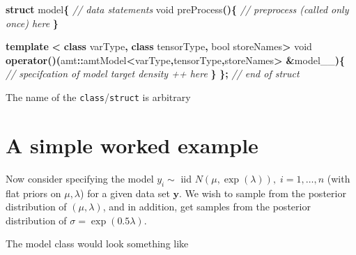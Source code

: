 \documentclass[
]{book}
\newenvironment{Shaded}{\begin{snugshade}}{\end{snugshade}}
\newcommand{\CommentTok}[1]{\textcolor[rgb]{0.56,0.35,0.01}{\textit{#1}}}
\newcommand{\DataTypeTok}[1]{\textcolor[rgb]{0.13,0.29,0.53}{#1}}
\newcommand{\KeywordTok}[1]{\textcolor[rgb]{0.13,0.29,0.53}{\textbf{#1}}}
\newcommand{\NormalTok}[1]{#1}
\newcommand{\OperatorTok}[1]{\textcolor[rgb]{0.81,0.36,0.00}{\textbf{#1}}}
\begin{document}
\begin{Shaded}
\begin{Highlighting}[]
\KeywordTok{struct}\NormalTok{ model}\OperatorTok{\{}
  \CommentTok{// data statements}
  \DataTypeTok{void}\NormalTok{ preProcess}\OperatorTok{()\{}
    \CommentTok{// preprocess (called only once) here}
  \OperatorTok{\}} 

  \KeywordTok{template} \OperatorTok{\textless{}} \KeywordTok{class}\NormalTok{ varType}\OperatorTok{,} \KeywordTok{class}\NormalTok{ tensorType}\OperatorTok{,} \DataTypeTok{bool}\NormalTok{ storeNames}\OperatorTok{\textgreater{}}
  \DataTypeTok{void} \KeywordTok{operator}\OperatorTok{()(}\NormalTok{amt}\OperatorTok{::}\NormalTok{amtModel}\OperatorTok{\textless{}}\NormalTok{varType}\OperatorTok{,}\NormalTok{tensorType}\OperatorTok{,}\NormalTok{storeNames}\OperatorTok{\textgreater{}} \OperatorTok{\&}\NormalTok{model\_\_}\OperatorTok{)\{}
    \CommentTok{// specifcation of model target density ++ here}
  \OperatorTok{\}} 
\OperatorTok{\};} \CommentTok{// end of struct}
\end{Highlighting}
\end{Shaded}

The name of the \texttt{class}/\texttt{struct} is arbitrary

\hypertarget{simple-worked-example}{%
\section{A simple worked example}\label{simple-worked-example}}

Now consider specifying the model \(y_i \sim\) iid \(N(\mu,\exp(\lambda)),\;i=1,\dots,n\) (with
flat priors on \(\mu,\lambda\)) for a given data set \(\mathbf y\). We wish to sample from the posterior distribution of \((\mu,\lambda)\), and in addition, get samples from the posterior distribution of \(\sigma=\exp(0.5\lambda)\).

The model class would look something like
\end{document}
